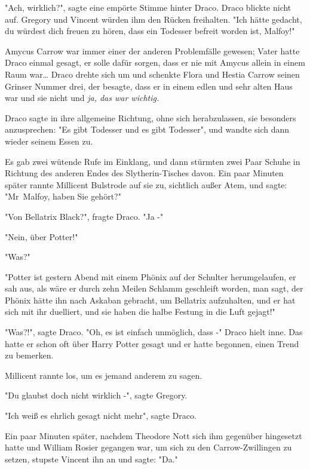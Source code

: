 {"Ach, wirklich?", sagte eine empörte Stimme hinter Draco. Draco blickte nicht auf. Gregory und Vincent würden ihm den Rücken freihalten. "Ich hätte gedacht, du würdest dich freuen zu hören, dass ein Todesser befreit worden ist, Malfoy!"

Amycus Carrow war immer einer der anderen Problemfälle gewesen; Vater hatte Draco einmal gesagt, er solle dafür sorgen, dass er nie mit Amycus allein in einem Raum war… Draco drehte sich um und schenkte Flora und Hestia Carrow seinen Grinser Nummer drei, der besagte, dass er in einem edlen und sehr alten Haus war und sie nicht und \emph{ja, das war wichtig.}

Draco sagte in ihre allgemeine Richtung, ohne sich herabzulassen, sie besonders anzusprechen: "Es gibt Todesser und es gibt Todesser", und wandte sich dann wieder seinem Essen zu.

Es gab zwei wütende Rufe im Einklang, und dann stürmten zwei Paar Schuhe in Richtung des anderen Endes des Slytherin-Tisches davon. Ein paar Minuten später rannte Millicent Bulstrode auf sie zu, sichtlich außer Atem, und sagte: "Mr~Malfoy, haben Sie gehört?"

"Von Bellatrix Black?", fragte Draco. "Ja -"

"Nein, über Potter!"

"Was?"

"Potter ist gestern Abend mit einem Phönix auf der Schulter herumgelaufen, er sah aus, als wäre er durch zehn Meilen Schlamm geschleift worden, man sagt, der Phönix hätte ihn nach Askaban gebracht, um Bellatrix aufzuhalten, und er hat sich mit ihr duelliert, und sie haben die halbe Festung in die Luft gejagt!"

"Was?!", sagte Draco. "Oh, es ist einfach unmöglich, dass -" Draco hielt inne. Das hatte er schon oft über Harry Potter gesagt und er hatte begonnen, einen Trend zu bemerken.

Millicent rannte los, um es jemand anderem zu sagen.

"Du glaubst doch nicht wirklich -", sagte Gregory.

"Ich weiß es ehrlich gesagt nicht mehr", sagte Draco.

Ein paar Minuten später, nachdem Theodore Nott sich ihm gegenüber hingesetzt hatte und William Rosier gegangen war, um sich zu den Carrow-Zwillingen zu setzen, stupste Vincent ihn an und sagte: "Da."

}
